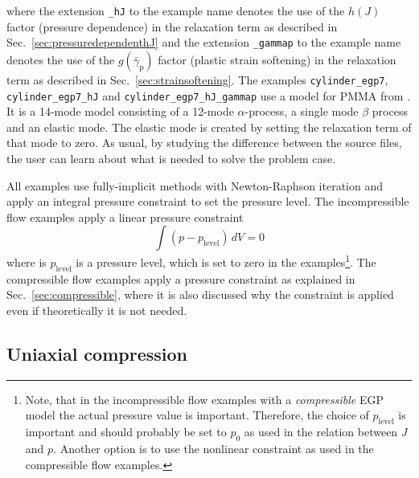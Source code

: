 where the extension \texttt{\_hJ} to the example name denotes the use of the $h(J)$ factor (pressure dependence) in the relaxation term as described in Sec.~\ref{sec:pressuredependenthJ} and the extension \texttt{\_gammap} to the example name denotes the use of the $g(\bar\gamma_\text{p})$ factor (plastic strain softening) in the relaxation term as described in Sec.~\ref{sec:strainsoftening}. The examples \texttt{cylinder\_egp7}, 
\texttt{cylinder\_egp7\_hJ} and \texttt{cylinder\_egp7\_hJ\_gammap} use a model for PMMA from \cite{van_breemen_rate_2012}. It is a 14-mode model consisting of a 12-mode $\alpha$-process, a single mode $\beta$ process and an elastic mode. The elastic mode is created by
setting the relaxation term of that mode to zero.
As usual, by studying the difference between the source files, the user can learn about what is needed to solve the problem case.

All examples use fully-implicit methods with Newton-Raphson iteration and apply an integral pressure constraint to set the pressure level. The incompressible flow examples apply a linear pressure constraint
\[
     \int ( p - p_\text{level} ) \,dV = 0
\]
where is $p_\text{level}$ is a pressure level, which is set to zero in the examples\footnote{Note, that in the incompressible flow examples with a \emph{compressible} EGP model the actual pressure value is important. 
Therefore, the choice of $p_\text{level}$ is important and should probably be set to $p_0$ as used in the relation between $J$ and $p$. Another option is to use the nonlinear constraint as used in the compressible flow examples.}.
The compressible flow examples apply
a pressure constraint as explained in Sec.~\ref{sec:compressible}, where it is also discussed why the constraint is applied even if theoretically it is not needed.

\subsection{Uniaxial compression}

